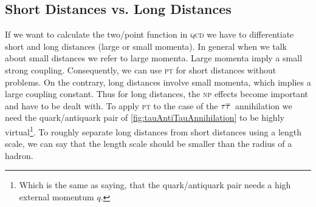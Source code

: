 \documentclass[../../index.tex]{subfiles}
\begin{document}
\subsection{Short Distances vs. Long Distances}
If we want to calculate the two\-/point function in \textsc{qcd} we have to
differentiate short and long distances (large or small momenta). In general when
we talk about small distances we refer to large momenta. Large momenta imply a
small strong coupling. Consequently, we can use \textsc{pt} for short distances
without problems. On the contrary, long distances involve small momenta, which
implies a large coupling constant. Thus for long distances, the \textsc{np}
effects become important and have to be dealt with. To apply \textsc{pt} to the
case of the \(\tau\overline{\tau}\,\) annihilation we need the quark\-/antiquark pair
of \cref{fig:tauAntiTauAnnihilation} to be highly virtual\footnote{Which is the
  same as saying, that the quark\-/antiquark pair needs a high external momentum
  \(q\).}. To roughly separate long distances from short distances using a
length scale, we can say that the length scale should be smaller than the radius
of a hadron.
\end{document}
